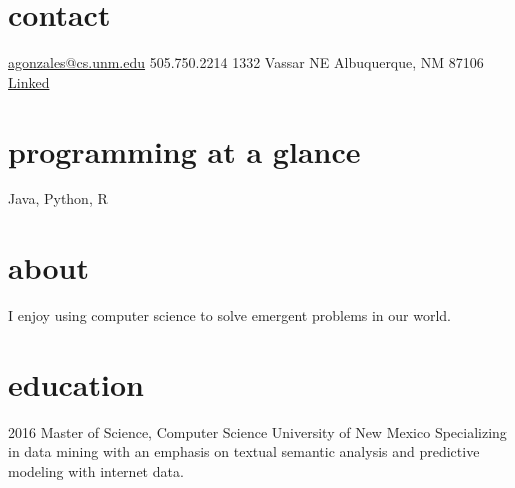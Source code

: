 \documentclass[]{friggeri-cv} %
\begin{document}


\begin{aside} %
\section{contact}
{\thinfont\href{mailto:agonzales@cs.unm.edu}{agonzales@cs.unm.edu}}
505.750.2214 
1332 Vassar NE
Albuquerque, NM 87106
\href{http://lnkd.in/b8kfQSe}{Linked\scriptsize{\faLinkedin}}
~
~
\section{programming at a glance}
Java, Python, R
~
\section{about}
I enjoy using computer science to solve emergent problems in our world.
\end{aside}




\section{education}
\begin{entrylist}
\entry
{2016}
{{\bodyfont Master of Science,} Computer Science}
{University of New Mexico}
{Specializing in data mining with an emphasis on textual semantic analysis
and predictive modeling with internet data.} 
\end{entrylist}
\end{document}
